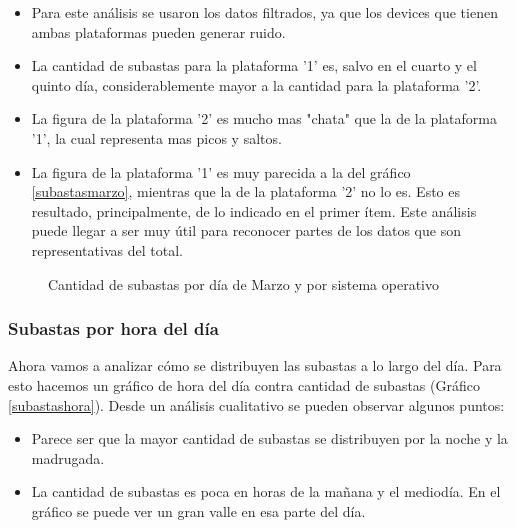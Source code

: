 \documentclass[a4paper, 12pt]{article}
\newcommand\tab[1][1cm]{\hspace*{#1}}
\begin{document}
	\begin{itemize}
		\item Para este análisis se usaron los datos filtrados, ya que los devices que tienen ambas plataformas pueden generar ruido.
		\item La cantidad de subastas para la plataforma '1' es, salvo en el cuarto y el quinto día, considerablemente mayor a la cantidad para la plataforma '2'.
		\item La figura de la plataforma '2' es mucho mas "chata" que la de la plataforma '1', la cual representa mas picos y saltos.
		\item La figura de la plataforma '1' es muy parecida a la del gráfico \ref{subastasmarzo}, mientras que la de la plataforma '2' no lo es. Esto es resultado, principalmente, de lo indicado en el primer ítem. Este análisis puede llegar a ser muy útil para reconocer partes de los datos que son representativas del total.
	\end{itemize}

	\FloatBarrier
	\begin{figure}
			\centering
		   	\caption{Cantidad de subastas por día de Marzo y por sistema operativo}
		   	\label{subastasmarzoSO}
		\end{figure}
	\FloatBarrier

	\subsubsection{Subastas por hora del día}
	\tab Ahora vamos a analizar cómo se distribuyen las subastas a lo largo del día. Para esto hacemos un gráfico de hora del día contra cantidad de subastas (Gráfico \ref{subastashora}).\newline
	\tab Desde un análisis cualitativo se pueden observar algunos puntos:
	\begin{itemize}
		\item Parece ser que la mayor cantidad de subastas se distribuyen por la noche y la madrugada.
		\item La cantidad de subastas es poca en horas de la mañana y el mediodía. En el gráfico se puede ver un gran valle en esa parte del día.
	\end{itemize}
\end{document}
